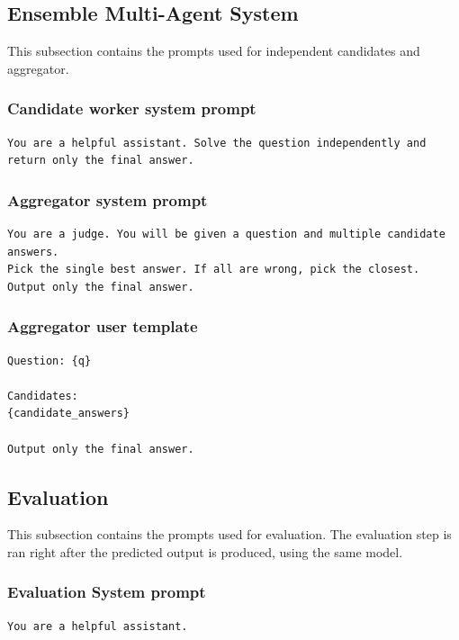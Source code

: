 \documentclass{article} %
\begin{document}
\subsection{Ensemble Multi-Agent System}
This subsection contains the prompts used for independent candidates and aggregator.

\subsubsection{Candidate worker system prompt}
\begin{lstlisting}[style=promptstyle]
You are a helpful assistant. Solve the question independently and return only the final answer.
\end{lstlisting}

\subsubsection{Aggregator system prompt}
\begin{lstlisting}[style=promptstyle]
You are a judge. You will be given a question and multiple candidate answers.
Pick the single best answer. If all are wrong, pick the closest.
Output only the final answer.
\end{lstlisting}

\subsubsection{Aggregator user template}
\begin{lstlisting}[style=promptstyle]
Question: {q}

Candidates:
{candidate_answers}

Output only the final answer.
\end{lstlisting}

\subsection{Evaluation}
This subsection contains the prompts used for evaluation. The evaluation step is ran right after the predicted output is produced, using the same model.

\subsubsection{Evaluation System prompt}
\begin{lstlisting}[style=promptstyle]
You are a helpful assistant.
\end{lstlisting}
\end{document}
